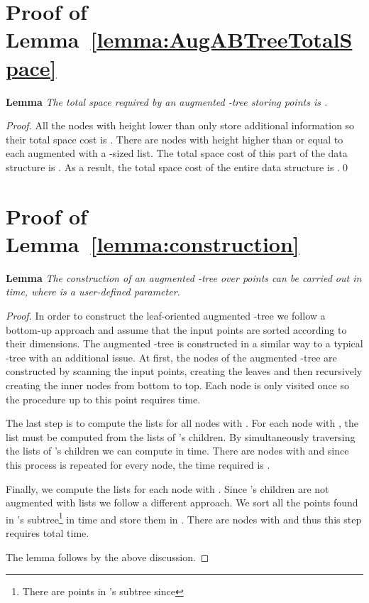 \documentclass{llncs}
\begin{document}
\section{Proof of Lemma~\ref{lemma:AugABTreeTotalSpace}} \label{app:lemma2}

\textbf{Lemma} \textit{The total space required by an augmented -tree storing  points is .}

\begin{proof}
All the nodes with height lower than  only store  additional information so their total space cost is . There are  nodes with height higher than or equal to  each augmented with a -sized list. The total space cost of this part of the data structure is . As a result, the total space cost of the entire data structure is .\qed
\end{proof}


\section{Proof of Lemma~\ref{lemma:construction}} \label{app:construction}


\textbf{Lemma} \textit{The construction of an augmented -tree over  points can be carried out in  time, where  is a user-defined parameter.}

\begin{proof}
In order to construct the leaf-oriented augmented -tree we follow a bottom-up approach and assume that the input points are sorted according to their dimensions. The augmented -tree is constructed in a similar way to a typical -tree with an additional issue. At first, the nodes of the augmented -tree are constructed by scanning the input points, creating the leaves and then recursively creating the inner nodes from bottom to top. Each node is only visited once so the procedure up to this point requires  time.

The last step is to compute the  lists for all nodes with . For each node  with , the  list must be computed from the  lists of 's children. By simultaneously traversing the   lists of 's children we can compute  in  time. There are  nodes with  and since this process is repeated for every node, the time required is .

Finally, we compute the  lists for each node  with . Since 's children are not augmented with  lists we follow a different approach. We sort all the points found in 's subtree\footnote{There are  points in 's subtree since } in  time and store them in . There are  nodes with  and thus this step requires  total time.

The lemma follows by the above discussion.
\end{proof}
\end{document}
